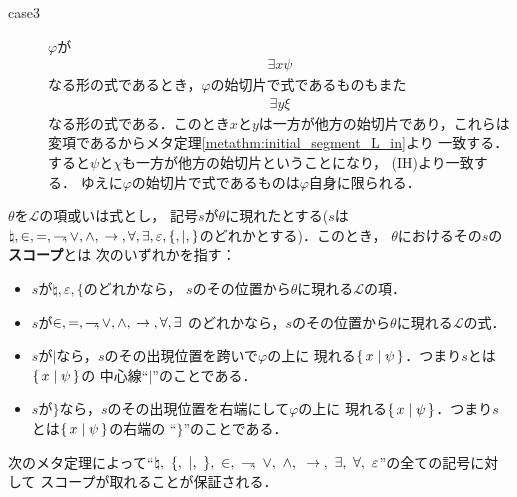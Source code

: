 \begin{metaprf}
\begin{description}
\begin{description}
					\item[case3] $\varphi$が
						\begin{align}
							\exists x \psi
						\end{align}
						なる形の式であるとき，$\varphi$の始切片で式であるものもまた
						\begin{align}
							\exists y \xi
						\end{align}
						なる形の式である．このとき$x$と$y$は一方が他方の始切片であり，これらは
						変項であるからメタ定理\ref{metathm:initial_segment_L_in}より
						一致する．すると$\psi$と$\chi$も一方が他方の始切片ということになり，
						(IH)より一致する．
						ゆえに$\varphi$の始切片で式であるものは$\varphi$自身に限られる．
						\QED
				\end{description}
		\end{description}
	\end{metaprf}
	
	\begin{screen}
		\begin{metadfn}
		\label{metadfn:L_epsilon_scope}
			$\theta$を$\mathcal{L}$の項或いは式とし，
			記号$s$が$\theta$に現れたとする($s$は$\natural,\in,=,\rightharpoondown\hspace{-0.25em},\vee,\wedge,
			\hspace{0.25em}\rightarrow\hspace{0.25em},\forall,\exists,\varepsilon,\{,|,\}$のどれかとする)．このとき，
			$\theta$におけるその$s$の{\bf スコープ}とは
			次のいずれかを指す：
			\begin{itemize}
				\item $s$が$\natural,\varepsilon,\{$のどれかなら，
					$s$のその位置から$\theta$に現れる$\mathcal{L}$の項．
				\item $s$が$\in,=,\rightharpoondown\hspace{-0.25em},\vee,\wedge,\hspace{0.25em}\rightarrow\hspace{0.25em},\forall,\exists$
					のどれかなら，$s$のその位置から$\theta$に現れる$\mathcal{L}$の式．
				\item $s$が$|$なら，$s$のその出現位置を跨いで$\varphi$の上に
					現れる$\{\, x \mid \psi\, \}$．つまり$s$とは$\{\, x \mid \psi\, \}$の
					中心線``$|$''のことである．
				\item $s$が$\}$なら，$s$のその出現位置を右端にして$\varphi$の上に
					現れる$\{\, x \mid \psi\, \}$．つまり$s$とは$\{\, x \mid \psi\, \}$の右端の
					``$\}$''のことである．
			\end{itemize}
		\end{metadfn}
	\end{screen}
	
	次のメタ定理によって``$\natural,\ \{,\ |,\ \},\ \in,\ \negation,\ \vee,
	\ \wedge,\ \rarrow,\ \exists,\ \forall,\ \varepsilon$''の全ての記号に対して
	スコープが取れることが保証される．
	
